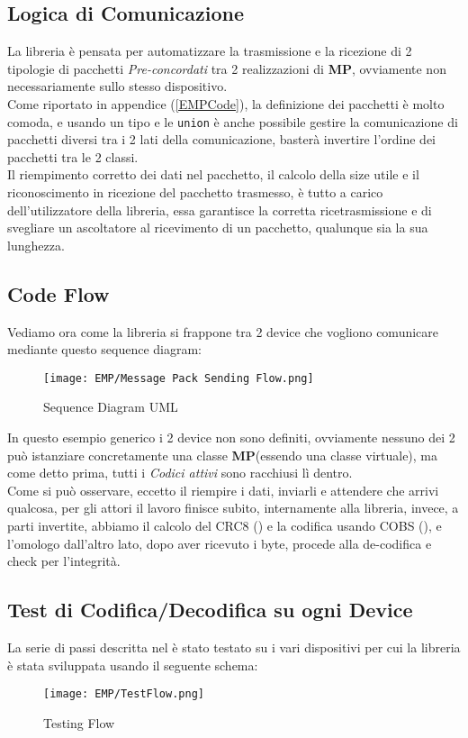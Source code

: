 \subsection{Logica di Comunicazione}
La libreria è pensata per automatizzare la trasmissione e la ricezione di 2 tipologie di pacchetti \textit{Pre-concordati} tra 2 realizzazioni di \textbf{MP}, ovviamente non necessariamente sullo stesso dispositivo.\\
Come riportato in appendice (\ref{EMPCode}), la definizione dei pacchetti è molto comoda, e usando un tipo e le \verb|union| è anche possibile gestire la comunicazione di pacchetti diversi tra i 2 lati della comunicazione, basterà invertire l'ordine dei pacchetti tra le 2 classi.\\
Il riempimento corretto dei dati nel pacchetto, il calcolo della size utile e il riconoscimento in ricezione del pacchetto trasmesso, è tutto a carico dell'utilizzatore della libreria, essa garantisce la corretta ricetrasmissione e di svegliare un ascoltatore al ricevimento di un pacchetto, qualunque sia la sua lunghezza.


\newpage
\subsection{Code Flow}\label{sub:codeFlow}
Vediamo ora come la libreria si frappone tra 2 device che vogliono comunicare mediante questo sequence diagram:\\
\begin{figure}[h]
	\centering
	\texttt{[image: EMP/Message Pack Sending Flow.png]}
	\caption[Sequence Diagram UML di EMP]{Sequence Diagram UML}
\end{figure}

\noindent
In questo esempio generico i 2 device non sono definiti, ovviamente nessuno dei 2 può istanziare concretamente una classe \textbf{MP}(essendo una classe virtuale), ma come detto prima, tutti i \textit{Codici attivi} sono racchiusi lì dentro.\\
Come si può osservare, eccetto il riempire i dati, inviarli e attendere che arrivi qualcosa, per gli attori il lavoro finisce subito, internamente alla libreria, invece, a parti invertite, abbiamo il calcolo del CRC8 (\cite{CRC8}) e la codifica usando COBS (\cite{COBS}), e l'omologo dall'altro lato, dopo aver ricevuto i byte, procede alla de-codifica e check per l'integrità.\\

\subsection{Test di Codifica/Decodifica su ogni Device}
La serie di passi descritta nel  è stato testato su i vari dispositivi per cui la libreria è stata sviluppata usando il seguente schema:
\begin{figure}[h]
	\centering
	\texttt{[image: EMP/TestFlow.png]}
	\caption[EMP Benchmark Testing Flow]{Testing Flow}
\end{figure}

